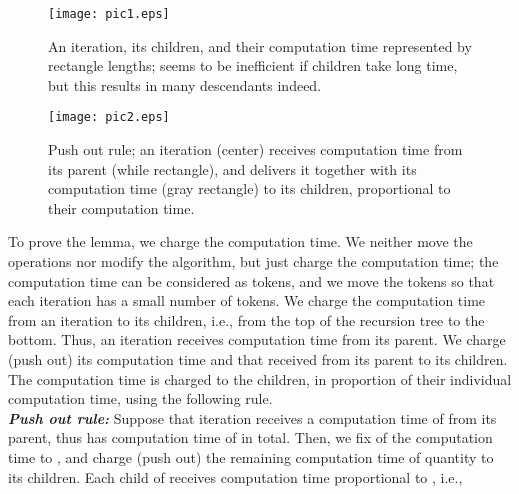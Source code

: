 \documentclass{llncs}
\begin{document}
\begin{figure}[t]
\begin{center}
\begin{minipage}{160pt}
\vspace{-4mm}
  \begin{center}
  \texttt{[image: pic1.eps]}
  \end{center}
\caption{An iteration, its children, and their computation time represented
    by rectangle lengths; seems to be inefficient if children take long time,
     but this results in many descendants indeed.
 }\label{fig:POcond}
\end{minipage}
\hspace{5mm}
\begin{minipage}{160pt}
\vspace{-4mm}
  \begin{center}
  \texttt{[image: pic2.eps]}
  \end{center}
\vspace{-4mm}
  \caption{Push out rule; an iteration (center) receives computation time 
  from its parent (while rectangle), and delivers it together with its
   computation time (gray rectangle) to its children, proportional to
    their computation time.
  }\label{fig:POrule}
\end{minipage}
\end{center}
\vspace{-4mm}
\end{figure}

\proof
To prove the lemma, we charge the computation time.
We neither move the operations nor modify the algorithm, but just
 charge the computation time; the computation time can be considered
 as tokens, and we move the tokens so that each iteration has a small
 number of tokens.
We charge the computation time from an iteration to its children, i.e.,
 from the top of the recursion tree to the bottom.
Thus, an iteration receives computation time from its parent.
We charge (push out) its computation time and that received from its parent 
 to its children.
The computation time is charged to the children, in proportion of their
 individual computation time, using the following rule.\\

\vspace{-1mm}
\noindent
{\bf \em Push out rule:}
Suppose that iteration  receives a computation time of  from
 its parent, thus  has computation time of  in total.
Then, we fix  of the computation
 time to , and charge (push out) the remaining computation time of quantity
  to its children.
Each child  of  receives computation time proportional to ,
 i.e., 
\end{document}
